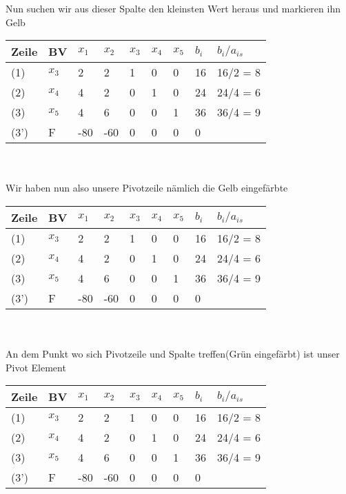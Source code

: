 \documentclass{article}
\begin{document}
Nun suchen wir aus dieser Spalte den kleinsten Wert heraus und markieren ihn Gelb\\
\begin{tabular}{|l|l|l|l|l|l|l|l|l|}
	\hline
	Zeile & BV & $x_{1}$&$x_{2}$&$x_{3}$&$x_{4}$&$x_{5}$&$b_{i}$&$b_{i}/a_{is}$\\
	\hline
	(1)&$x_{3}$&\cellcolor{red}2&2&1&0&0&16&16/2 = 8\\
	\hline
	(2)&$x_{4}$&\cellcolor{red}4&2&0&1&0&24&\cellcolor{yellow}24/4 = 6\\
	\hline
	(3)&$x_{5}$&\cellcolor{red}4&6&0&0&1&36&36/4 = 9\\
	\hline
	(3')&F&\cellcolor{red}-80&-60&0&0&0&0&\\
	\hline
\end{tabular}\\\\
Wir haben nun also unsere Pivotzeile nämlich die Gelb eingefärbte\\
\begin{tabular}{|l|l|l|l|l|l|l|l|l|}
	\hline
	Zeile & BV & $x_{1}$&$x_{2}$&$x_{3}$&$x_{4}$&$x_{5}$&$b_{i}$&$b_{i}/a_{is}$\\
	\hline
	(1)&$x_{3}$&\cellcolor{red}2&2&1&0&0&16&16/2 = 8\\
	\hline
	(2)&\cellcolor{yellow}$x_{4}$&\cellcolor{yellow}4&\cellcolor{yellow}2&\cellcolor{yellow}0&\cellcolor{yellow}1&\cellcolor{yellow}0&\cellcolor{yellow}24&\cellcolor{yellow}24/4 = 6\\
	\hline
	(3)&$x_{5}$&\cellcolor{red}4&6&0&0&1&36&36/4 = 9\\
	\hline
	(3')&F&\cellcolor{red}-80&-60&0&0&0&0&\\
	\hline
\end{tabular}\\\\
An dem Punkt wo sich Pivotzeile und Spalte treffen(Grün eingefärbt) ist unser Pivot Element\\
\begin{tabular}{|l|l|l|l|l|l|l|l|l|}
	\hline
	Zeile & BV & $x_{1}$&$x_{2}$&$x_{3}$&$x_{4}$&$x_{5}$&$b_{i}$&$b_{i}/a_{is}$\\
	\hline
	(1)&$x_{3}$&\cellcolor{red}2&2&1&0&0&16&16/2 = 8\\
	\hline
	(2)&\cellcolor{yellow}$x_{4}$&\cellcolor{green}4&\cellcolor{yellow}2&\cellcolor{yellow}0&\cellcolor{yellow}1&\cellcolor{yellow}0&\cellcolor{yellow}24&\cellcolor{yellow}24/4 = 6\\
	\hline
	(3)&$x_{5}$&\cellcolor{red}4&6&0&0&1&36&36/4 = 9\\
	\hline
	(3')&F&\cellcolor{red}-80&-60&0&0&0&0&\\
	\hline
\end{tabular}\\\\
\end{document}
